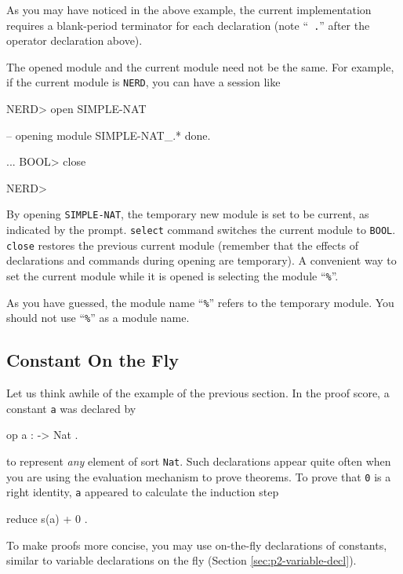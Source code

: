 \documentclass[a4paper]{memoir}
\begin{document}
\begin{warning}
  As you may have noticed in the above example,
  the current implementation requires a blank-period terminator
  for each declaration (note ``\verb| .|'' after the operator
  declaration above).
\end{warning}

The opened module and the current module need not be the same. For
example, if the current module is \verb|NERD|, you can have a session
like
\begin{vvtm}
\begin{ccode}
   NERD> open SIMPLE-NAT

  -- opening module SIMPLE-NAT_.* done.

   ...
   BOOL> close

   NERD> 
\end{ccode}
\end{vvtm}
By opening \verb|SIMPLE-NAT|, the temporary new module is set to be current,
as indicated by the prompt. \verb|select| command switches the current
module to \verb|BOOL|. \verb|close| restores the previous
current module (remember that the effects of declarations and commands
during opening are temporary).
A convenient way to set the current module while it is
opened is selecting the module ``\verb|%|''.
\begin{vvtm}
\begin{ccode}

\end{ccode}
\end{vvtm}

\begin{warning}
  As you have guessed, the module name ``\verb|%|'' refers to the 
  temporary module. You should not use ``\verb|%|'' as a module name.
\end{warning}

\subsection{Constant On the Fly}\label{sec:p2-temporary-constant}

Let us think awhile of the example of the previous section. In
the proof score, a constant \verb|a| was declared by
\begin{vvtm}
\begin{ccode}
  op a : -> Nat .
\end{ccode}
\end{vvtm}
to represent {\em any} element of sort \verb|Nat|. Such declarations
appear quite often when you are using the evaluation mechanism to
prove theorems. To prove that \verb|0| is a right identity, \verb|a|
appeared to calculate the induction step
\begin{vvtm}
\begin{ccode}
  reduce s(a) + 0 .
\end{ccode}
\end{vvtm}
To make proofs more concise, you may use on-the-fly declarations
of constants, similar to variable declarations on the fly
(Section \ref{sec:p2-variable-decl}).
\end{document}
